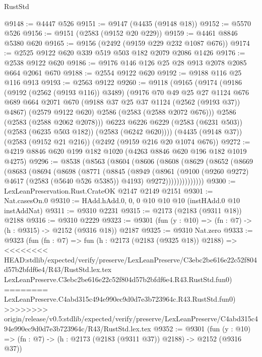 \begin{lexlean}{RustStd}
\begin{coremodule}
{\begin{coremodule}
{{{{{{{{{{{{{{{@9148 := @4447 @526
@9151 := @9147 (@4435 (@9148 @18))
@9152 := @5570 @526
@9156 := @9151 (@2583 (@9152 @20 @229))
@9159 := @4461 @8846 @5380 @620
@9165 := @9156 (@2492 (@9159 @229 @232 @1087 @676))
@9174 := @2525 @9122 @620 @339 @519 @503 @182 @2079 @2086 @1426
@9176 := @2538 @9122 @620
@9186 := @9176 @146 @126 @25 @28 @913 @2078 @2085 @664 @2061 @670
@9188 := @2554 @9122 @620
@9192 := @9188 @116 @25 @116 @913
@9193 := @2563 @9122
@9260 := @9118
    (@9165
      (@9174
        (@9186
          (@9192 (@2562 (@9193 @116)) @3489)
          (@9176
            @70
            @49
            @25
            @27
            @1124
            @676
            @689
            @664
            @2071
            @670
            (@9188 @37 @25 @37 @1124 (@2562 (@9193 @37)) @4867)
            (@2579 @9122 @620)
            @2586
            (@2583 (@2588 @2072 @676)))
          @2586
          (@2583 (@2588 @2062 @2078)))
        @6223
        @6226
        @6229
        (@2583 (@6231 @503))
        (@2583 (@6235 @503 @182))
        (@2583 (@6242 @620))))
    (@4435 (@9148 @37))
    (@2583 (@9152 @21 @216))
    (@2492 (@9159 @216 @20 @1074 @676))
@9272 := @4219 @8846 @620 @199 @182 @1020 (@4263 @8846 @620 @196 @182 @1019 @4275)
@9296 := @8538
    (@8563
      (@8604
        (@8606
          (@8608
            (@8629
              (@8652
                (@8669
                  (@8683
                    (@8694
                      (@8698
                        (@8771
                          (@8845
                            (@8949
                              (@8961
                                (@9100 (@9260 @9272) @4617 (@2583 (@5640 @526 @5385)) @4193)
                                @9272))))))))))))))
@9300 := LexLeanPreservation.Rust.CrateOK @2147 @2149 @2151
@9301 := Nat.casesOn.{0}
@9310 := HAdd.hAdd.{0, 0, 0} @10 @10 @10 (instHAdd.{0} @10 instAddNat)
@9311 := @9310 @2231
@9315 := @2173 (@2183 (@9311 @18)) @2188
@9316 := @9310 @2229
@9323 := @9301 (fun (y : @10) => (fn : @7) -> (h : @9315) -> @2152 (@9316 @18)) @2187
@9325 := @9310 Nat.zero
@9333 := @9323
    (fun (fn : @7) =>
    fun (h : @2173 (@2183 (@9325 @18)) @2188) =>
<<<<<<<< HEAD:stdlib/expected/verify/preserve/LexLeanPreserve/C3ebc2be616e22c52f804d57b2bfdf6e4/R43/RustStd.lex.tex
    LexLeanPreserve.C3ebc2be616e22c52f804d57b2bfdf6e4.R43.RustStd.fun0)
========
    LexLeanPreserve.C4abd315c494e990ec9d0d7e3b723964c.R43.RustStd.fun0)
>>>>>>>> origin/release/v0.5:stdlib/expected/verify/preserve/LexLeanPreserve/C4abd315c494e990ec9d0d7e3b723964c/R43/RustStd.lex.tex
@9352 := @9301
    (fun (y : @10) => (fn : @7) -> (h : @2173 (@2183 (@9311 @37)) @2188) -> @2152 (@9316 @37))
}}}}}}}}}}}}}}}
\end{coremodule}}
\end{coremodule}
\end{lexlean}
